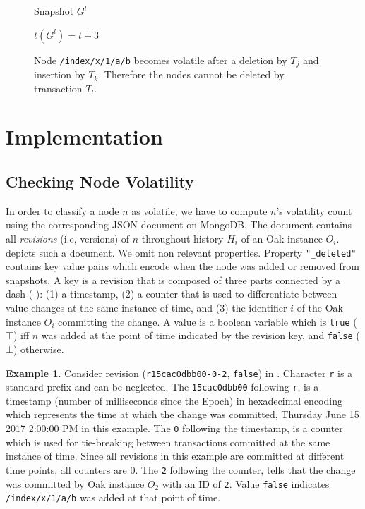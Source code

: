 \documentclass[abstracton,12pt]{scrartcl}
\theoremstyle{definition}
\newtheorem{example}{Example}
\begin{document}
\begin{figure}[h]
\begin{scriptsize}
\begin{multicols}{4}
\begin{center}
{                    \vspace{27mm}
                }

                Snapshot $G^l$

                $t(G^l) = t + 3$
            \end{center}
        \end{multicols}
    \end{scriptsize}
    \caption{Node \texttt{/index/x/1/a/b} becomes volatile after a deletion by $T_j$ and insertion by $T_k$. Therefore the nodes cannot be deleted by transaction $T_l$.}
    \label{fig:vol_example}
\end{figure}

\newpage
\section{Implementation}
\label{sec:implementation}

\subsection{Checking Node Volatility}

In order to classify a node $n$ as volatile, we have to compute $n$'s volatility count using the corresponding JSON document on MongoDB.
The document contains all \textit{revisions} (i.e, versions) of $n$ throughout history $H_i$ of an Oak instance $O_i$.
 depicts such a document.
We omit non relevant properties.
Property \texttt{"\_deleted"} contains key value pairs which encode when the node was added or removed from snapshots.
A key is a revision that is composed of three parts connected by a dash (-): (1) a timestamp, (2) a counter that is used to differentiate between value changes at the same instance of time, and (3) the identifier $i$ of the Oak instance $O_i$ committing the change.
A value is a boolean variable which is \texttt{true} ($\top$) iff $n$ was added at the point of time indicated by the revision key, and \texttt{false} ($\bot$) otherwise.
\begin{example}
    Consider revision (\texttt{r15cac0dbb00-0-2}, \texttt{false}) in .
    Character \texttt{r} is a standard prefix and can be neglected.
    The \texttt{15cac0dbb00} following \texttt{r}, is a timestamp (number of milliseconds since the Epoch) in hexadecimal encoding which represents the time at which the change was committed, Thursday June 15 2017 2:00:00 PM in this example.
    The \texttt{0} following the timestamp, is a counter which is used for tie-breaking between transactions committed at the same instance of time.
    Since all revisions in this example are committed at different time points, all counters are $0$.
    The \texttt{2} following the counter, tells that the change was committed by Oak instance $O_2$ with an ID of \texttt{2}.
    Value \texttt{false} indicates \texttt{/index/x/1/a/b} was added at that point of time.
\end{example}
\end{document}
